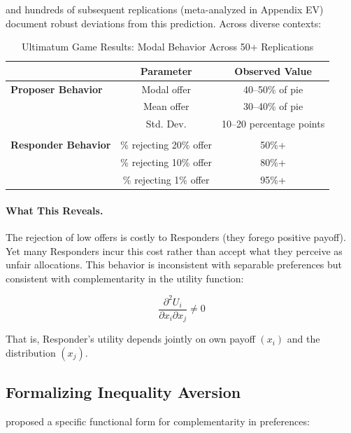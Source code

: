\documentclass[12pt,oneside]{book}
\begin{document}
\citet{guth1982} and hundreds of subsequent replications (meta-analyzed in Appendix EV) document
robust deviations from this prediction. Across diverse contexts:

\begin{table}[htbp]
\centering
\caption{Ultimatum Game Results: Modal Behavior Across 50+ Replications}
\label{tab:ultimatum}
\begin{tabular}{@{}lcc@{}}
\toprule
& \textbf{Parameter} & \textbf{Observed Value} \\
\midrule
\textbf{Proposer Behavior} & Modal offer & 40--50\% of pie \\
                           & Mean offer & 30--40\% of pie \\
                           & Std. Dev. & 10--20 percentage points \\
\\
\textbf{Responder Behavior} & \% rejecting 20\% offer & 50\%+ \\
                             & \% rejecting 10\% offer & 80\%+ \\
                             & \% rejecting 1\% offer & 95\%+ \\
\midrule
\end{tabular}
\end{table}

\paragraph{What This Reveals.} The rejection of low offers is costly to Responders (they forego positive payoff).
Yet many Responders incur this cost rather than accept what they perceive as unfair allocations.
This behavior is inconsistent with separable preferences but consistent with complementarity
in the utility function:

\begin{equation}
\frac{\partial^2 U_i}{\partial x_i \partial x_j} \neq 0
\end{equation}

That is, Responder's utility depends jointly on own payoff $(x_i)$ and the distribution $(x_j)$.

\subsection{Formalizing Inequality Aversion}

\citet{fehrschmidt} proposed a specific functional form for complementarity in preferences:
\end{document}
